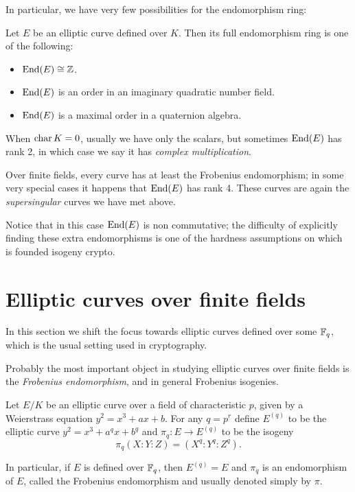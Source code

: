 In particular, we have very few possibilities for the endomorphism ring:
\begin{theorem}
    Let $E$ be an elliptic curve defined over $K$. Then its full endomorphism ring is one of the following:
    \begin{itemize}
        \item $\operatorname{End}(E)\cong\mathbb{Z}$.
        \item $\operatorname{End}(E)$ is an order in an imaginary quadratic number field.
        \item $\operatorname{End}(E)$ is a maximal order in a quaternion algebra.
    \end{itemize}
\end{theorem}

When $\operatorname{char} K=0$, usually we have only the scalars, but sometimes $\operatorname{End}(E)$ has rank 2, in which case we say it has \emph{complex multiplication}.

Over finite fields, every curve has at least the Frobenius endomorphism; in some very special cases it happens that $\operatorname{End}(E)$ has rank 4. These curves are again the \emph{supersingular} curves we have met above.

Notice that in this case $\operatorname{End}(E)$ is non commutative; the difficulty of explicitly finding these extra endomorphisms is one of the hardness assumptions on which is founded isogeny crypto.


\section{Elliptic curves over finite fields}

In this section we shift the focus towards elliptic curves defined over some $\mathbb{F}_q$, which is the usual setting used in cryptography.

Probably the most important object in studying elliptic curves over finite fields is the \emph{Frobenius endomorphism}, and in general Frobenius isogenies.

\begin{definition}
    Let $E/K$ be an elliptic curve over a field of characteristic $p$, given by a Weierstrass equation $y^2=x^3+ax+b$. For any $q=p^r$ define $E^{(q)}$ to be the elliptic curve $y^2=x^3+a^qx+b^q$ and $\pi_q:E\to E^{(q)}$ to be the isogeny $$\pi_q(X:Y:Z)=(X^q:Y^q:Z^q).$$
    
    In particular, if $E$ is defined over $\mathbb{F}_q$, then $E^{(q)}=E$ and $\pi_q$ is an endomorphism of $E$, called the Frobenius endomorphism and usually denoted simply by $\pi$.
\end{definition}


